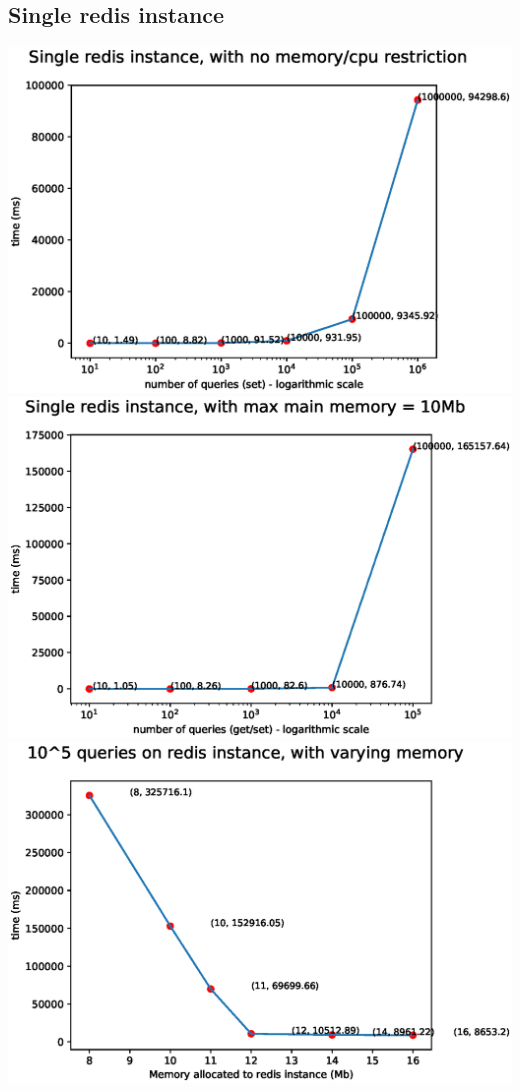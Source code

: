 \documentclass[11pt]{article}
\begin{document}
\subsection*{Single redis instance}
\includegraphics[width=\textwidth]{fig1.eps}
\includegraphics[width=\textwidth]{fig2.eps}
\includegraphics[width=\textwidth]{fig3.eps}
\end{document}
